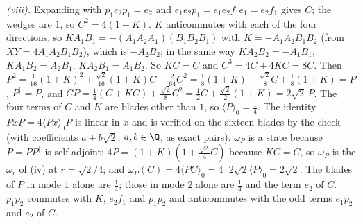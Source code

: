 \emph{(viii).} Expanding with $p_{1}e_{2}p_{1} = e_{2}$ and $e_{1}e_{2}p_{1} = e_{1}e_{2}f_{1}e_{1} = e_{2}f_{1}$ gives $C$; the wedges are $1$, so $C^{2} = 4(1 + K)$. $K$ anticommutes with each of the four directions, so $KA_{1}B_{1} = -(A_{1}A_{2}A_{1})(B_{1}B_{2}B_{1})$ with $K = -A_{1}A_{2}B_{1}B_{2}$ (from $XY = 4A_{1}A_{2}B_{1}B_{2}$), which is $-A_{2}B_{2}$; in the same way $KA_{2}B_{2} = -A_{1}B_{1}$, $KA_{1}B_{2} = A_{2}B_{1}$, $KA_{2}B_{1} = A_{1}B_{2}$. So $KC = C$ and $C^{3} = 4C + 4KC = 8C$. Then $P^{2} = \tfrac{1}{16}(1 + K)^{2} + \tfrac{\sqrt{2}}{16}(1 + K)C + \tfrac{2}{64}C^{2} = \tfrac18(1 + K) + \tfrac{\sqrt{2}}{8}C + \tfrac18(1 + K) = P$, $P^{\dagger} = P$, and $CP = \tfrac14(C + KC) + \tfrac{\sqrt{2}}{8}C^{2} = \tfrac12C + \tfrac{\sqrt{2}}{2}(1 + K) = 2\sqrt{2}\,P$. The four terms of $C$ and $K$ are blades other than $1$, so $\langle P\rangle_{0} = \tfrac14$. The identity $PxP = 4\langle Px\rangle_{0}P$ is linear in $x$ and is verified on the sixteen blades by the check (with coefficients $a + b\sqrt{2}$, $a, b \in \Q$, as exact pairs). $\omega_{P}$ is a state because $P = PP^{\dagger}$ is self-adjoint; $4P = (1 + K)(1 + \tfrac{\sqrt{2}}{4}C)$ because $KC = C$, so $\omega_{P}$ is the $\omega_{r}$ of (iv) at $r = \sqrt{2}/4$; and $\omega_{P}(C) = 4\langle PC\rangle_{0} = 4 \cdot 2\sqrt{2}\langle P\rangle_{0} = 2\sqrt{2}$. The blades of $P$ in mode $1$ alone are $\tfrac14$; those in mode $2$ alone are $\tfrac14$ and the term $e_{2}$ of $C$. $p_{1}p_{2}$ commutes with $K$, $e_{2}f_{1}$ and $p_{1}p_{2}$ and anticommutes with the odd terms $e_{1}p_{2}$ and $e_{2}$ of $C$.

